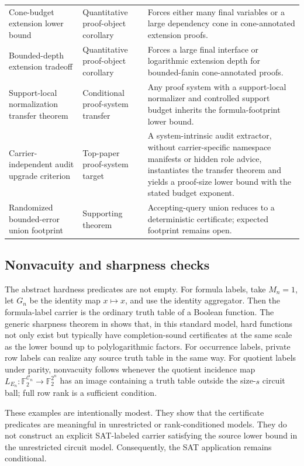 \documentclass[11pt]{article}
\theoremstyle{definition}
\begin{document}
{\begin{longtable}{@{}p{}p{}p{}@{}}
Cone-budget extension lower bound & Quantitative proof-object corollary & Forces either many final variables or a large dependency cone in cone-annotated extension proofs. \\
Bounded-depth extension tradeoff & Quantitative proof-object corollary & Forces a large final interface or logarithmic extension depth for bounded-fanin cone-annotated proofs. \\
Support-local normalization transfer theorem & Conditional proof-system transfer & Any proof system with a support-local normalizer and controlled support budget inherits the formula-footprint lower bound. \\
Carrier-independent audit upgrade criterion & Top-paper proof-system target & A system-intrinsic audit extractor, without carrier-specific namespace manifests or hidden role advice, instantiates the transfer theorem and yields a proof-size lower bound with the stated budget exponent. \\
Randomized bounded-error union footprint & Supporting theorem & Accepting-query union reduces to a deterministic certificate; expected footprint remains open. \\
\bottomrule
\end{longtable}
}

\subsection{Nonvacuity and sharpness checks}

The abstract hardness predicates are not empty.  For formula labels, take \(M_n=1\), let \(G_n\) be the identity map \(x\mapsto x\), and use the identity aggregator.  Then the formula-label carrier is the ordinary truth table of a Boolean function.  The generic sharpness theorem in  shows that, in this standard model, hard functions not only exist but typically have completion-sound certificates at the same scale as the lower bound up to polylogarithmic factors.  For occurrence labels, private row labels can realize any source truth table in the same way.  For quotient labels under parity, nonvacuity follows whenever the quotient incidence map \(L_{E_n}:\mathbb F_2^{\mathcal C_n}\to\mathbb F_2^{2^n}\) has an image containing a truth table outside the size-\(s\) circuit ball; full row rank is a sufficient condition.

These examples are intentionally modest.  They show that the certificate predicates are meaningful in unrestricted or rank-conditioned models.  They do not construct an explicit SAT-labeled carrier satisfying the source lower bound in the unrestricted circuit model.  Consequently, the SAT application remains conditional.
\end{document}
